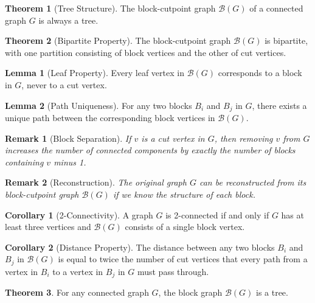 \documentclass{article}
\newtheorem{remark}{Remark}
\theoremstyle{definition}
\newtheorem{theorem}{Theorem}
\newtheorem{lemma}{Lemma}
\newtheorem{corollary}{Corollary}
\begin{document}
\begin{theorem}[Tree Structure]
The block-cutpoint graph $\mathcal{B}(G)$ of a connected graph $G$ is always a tree.
\end{theorem}

\begin{theorem}[Bipartite Property]
The block-cutpoint graph $\mathcal{B}(G)$ is bipartite, with one partition consisting of block vertices and the other of cut vertices.
\end{theorem}

\begin{lemma}[Leaf Property]
Every leaf vertex in $\mathcal{B}(G)$ corresponds to a block in $G$, never to a cut vertex.
\end{lemma}

\begin{lemma}[Path Uniqueness]
For any two blocks $B_i$ and $B_j$ in $G$, there exists a unique path between the corresponding block vertices in $\mathcal{B}(G)$.
\end{lemma}

\begin{remark}[Block Separation]
If $v$ is a cut vertex in $G$, then removing $v$ from $G$ increases the number of connected components by exactly the number of blocks containing $v$ minus 1.
\end{remark}

\begin{remark}[Reconstruction]
The original graph $G$ can be reconstructed from its block-cutpoint graph $\mathcal{B}(G)$ if we know the structure of each block.
\end{remark}

\begin{corollary}[2-Connectivity]
A graph $G$ is 2-connected if and only if $G$ has at least three vertices and $\mathcal{B}(G)$ consists of a single block vertex.
\end{corollary}

\begin{corollary}[Distance Property]
The distance between any two blocks $B_i$ and $B_j$ in $\mathcal{B}(G)$ is equal to twice the number of cut vertices that every path from a vertex in $B_i$ to a vertex in $B_j$ in $G$ must pass through.
\end{corollary}

\begin{theorem}
For any connected graph $G$, the block graph $\mathcal{B}(G)$ is a tree.
\end{theorem}
\end{document}
